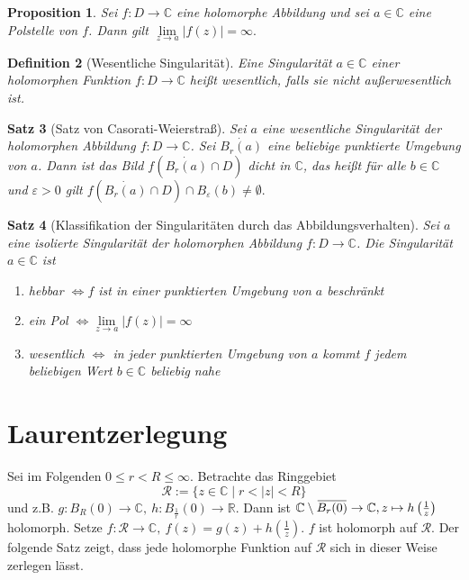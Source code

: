 \documentclass[a4paper,12pt]{book}
\renewcommand{\epsilon}{\varepsilon}
\theoremstyle{newthm}
\newtheorem{thm}{Satz}[section]
\newtheorem{prop}[thm]{Proposition}
\theoremstyle{newdef}
\newtheorem{defn}[thm]{Definition}
\theoremstyle{newrem}
\newcommand{\R}{\mathbb{R}}
\newcommand{\C}{\mathbb{C}}
\newcommand{\overbar}[1]{\mkern 1.5mu\overline{\mkern-1.5mu#1\mkern-1.5mu}\mkern 1.5mu}
\begin{document}
		\begin{prop}
			Sei $ f: D \to \C $ eine holomorphe Abbildung und sei $ a \in \C $ eine Polstelle von $f$. Dann gilt $ \lim\limits_{z\to a} |f(z)| = \infty. $
		\end{prop}
		
		\begin{defn}[Wesentliche Singularität]
			Eine Singularität $a \in \C$ einer holomorphen Funktion $f: D \to \C$ heißt \emph{wesentlich}, falls sie nicht außerwesentlich ist.
		\end{defn}
		
		\begin{thm}[Satz von Casorati-Weierstraß]
			Sei $a$ eine wesentliche Singularität der holomorphen Abbildung $f: D \to \C$. Sei $ \dot{B_r(a)} $ eine beliebige punktierte Umgebung von $a$. Dann ist das Bild $ f\left(\dot{B_r(a)} \cap D\right) $ dicht in $\C$, das heißt für alle $b \in \C$ und $\epsilon > 0$ gilt $ f\left( \dot{B_r(a)} \cap D\right) \cap B_\epsilon(b) \neq \emptyset. $
		\end{thm}
		
		\begin{thm}[Klassifikation der Singularitäten durch das Abbildungsverhalten]
			Sei $a$ eine isolierte Singularität der holomorphen Abbildung $f: D \to \C$. Die Singularität $a \in \C$ ist
			\begin{enumerate}[label={\roman*})]
				\item hebbar $\iff f$ ist in einer punktierten Umgebung von $a$ beschränkt
				\item ein Pol $\iff \lim\limits_{z\to a}|f(z)| = \infty$
				\item wesentlich $\iff$ in jeder punktierten Umgebung von $a$ kommt $f$ jedem beliebigen Wert $b \in \C$ beliebig nahe
			\end{enumerate}
		\end{thm}
	
	
	\section{Laurentzerlegung}
		
		Sei im Folgenden $ 0 \leq r < R \leq \infty $. Betrachte das Ringgebiet $$ \mathcal{R} := \{z \in \C \mid r < |z| < R\} $$
		und z.B. $ g: B_R(0) \to \C,\ h: B_{\frac{1}{r}}(0) \to \R. $ Dann ist $ \C \setminus \overbar{B_r(0)} \to \C, z \mapsto h\left(\frac{1}{z}\right) $ holomorph. Setze $ f: \mathcal{R} \to \C,\ f(z) = g(z) + h\left(\frac{1}{z}\right). $ $f$ ist holomorph auf $\mathcal{R}$. Der folgende Satz zeigt, dass jede holomorphe Funktion auf $ \mathcal{R} $ sich in dieser Weise zerlegen lässt.
		
\end{document}
